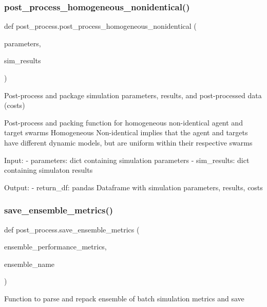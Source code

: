 \subsubsection{\texorpdfstring{post\_process\_homogeneous\_nonidentical()}{post\_process\_homogeneous\_nonidentical()}}
{\footnotesize\ttfamily def post\+\_\+process.\+post\+\_\+process\+\_\+homogeneous\+\_\+nonidentical (\begin{DoxyParamCaption}\item[{}]{parameters,  }\item[{}]{sim\+\_\+results }\end{DoxyParamCaption})}

\begin{DoxyVerb}Post-process and package simulation parameters, results, and post-processed data (costs)

Post-process and packing function for homogeneous non-identical agent and target swarms
Homogeneous Non-identical implies that the agent and targets have different dynamic models, but are uniform
within their respective swarms

Input:
- parameters:           dict containing simulation parameters
- sim_results:          dict containing simulaton results

Output:
- return_df:            pandas Dataframe with simulation parameters, results, costs\end{DoxyVerb}
 \mbox{\label{namespacepost__process_a10e87205bfefad170e33d3b2aa386598}} 
\subsubsection{\texorpdfstring{save\_ensemble\_metrics()}{save\_ensemble\_metrics()}}
{\footnotesize\ttfamily def post\+\_\+process.\+save\+\_\+ensemble\+\_\+metrics (\begin{DoxyParamCaption}\item[{}]{ensemble\+\_\+performance\+\_\+metrics,  }\item[{}]{ensemble\+\_\+name }\end{DoxyParamCaption})}

\begin{DoxyVerb}Function to parse and repack ensemble of batch simulation metrics and save
\end{DoxyVerb}
 \mbox{\label{namespacepost__process_ac0513ae17e16904513842075429d02f1}} 
